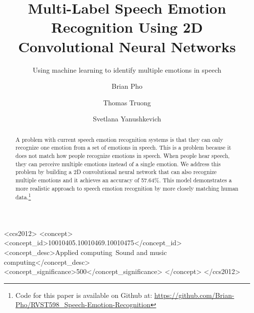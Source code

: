 \documentclass[sigconf]{acmart}
\begin{document}
\title{Multi-Label Speech Emotion Recognition Using 2D Convolutional Neural Networks}
\subtitle{Using machine learning to identify multiple emotions in speech}


\author{Brian Pho}

\author{Thomas Truong}

\author{Svetlana Yanushkevich}

\renewcommand{\shortauthors}{B. Pho et al.}


\begin{abstract}
A problem with current speech emotion recognition systems is that they can only recognize one emotion from a set of emotions in speech. This is a problem because it does not match how people recognize emotions in speech. When people hear speech, they can perceive multiple emotions instead of a single emotion. We address this problem by building a 2D convolutional neural network that can also recognize multiple emotions and it achieves an accuracy of 57.64\%. This model demonstrates a more realistic approach to speech emotion recognition by more closely matching human data.\footnote{Code for this paper is available on Github at: \url{https://github.com/Brian-Pho/RVST598_Speech-Emotion-Recognition}}
\end{abstract}

%
%
\begin{CCSXML}
	<ccs2012>
	<concept>
	<concept_id>10010405.10010469.10010475</concept_id>
	<concept_desc>Applied computing~Sound and music computing</concept_desc>
	<concept_significance>500</concept_significance>
	</concept>
	</ccs2012>
\end{CCSXML}





\maketitle




 
\end{document}
